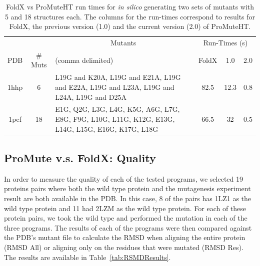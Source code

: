 \documentclass[sigconf]{acmart}
\begin{document}
\begin{table}[h]
	\caption{FoldX vs ProMuteHT run times for \textit{in silico} generating two sets of mutants with 5 and 18 structures each. The columns for the run-times correspond to results for FoldX, the previous version (1.0) and the current version (2.0) of ProMuteHT.}
	\label{tab:foldxcompare} 
	\centering
	\begin{tabular}{|c|c|p{2.8cm}|c|c|c|} \hline
		\rowcolor{lightgray}& & \multicolumn{1}{c|}{Mutants} & \multicolumn{3}{c|}{Run-Times (s)}\\
		\cline{4-5}
		\rowcolor{lightgray} PDB & \# Muts & (comma delimited) & FoldX & 1.0 & 2.0\\ \hline
		1hhp& 6 & L19G and K20A, L19G and E21A, L19G and E22A, L19G and L23A, L19G and L24A, L19G and D25A & 82.5 & 12.3 & 0.8 \\ \hline
		1pef& 18 & E1G, Q2G, L3G, L4G, K5G, A6G, L7G, E8G, F9G, L10G, L11G, K12G, E13G, L14G, L15G, E16G, K17G, L18G & 66.5 & 32 & 0.5 \\ \hline
	\end{tabular}
\end{table}

\subsection{ProMute v.s. FoldX: Quality}
In order to measure the quality of each of the tested programs, we selected 19 proteins pairs where both the wild type protein and the mutagenesis experiment result are both available in the PDB.  In this case, 8 of the pairs has 1LZ1 as the wild type protein and 11 had 2LZM as the wild type protein.  For each of these protein pairs, we took the wild type and performed the mutation in each of the three programs.  The results of each of the programs were then compared against the PDB's mutant file to calculate the RMSD when aligning the entire protein (RMSD All) or aligning only on the residues that were mutated (RMSD Res). The results are available in Table~\ref{tab:RSMDResults}.
\end{document}
